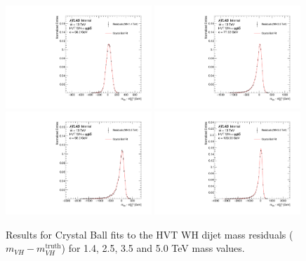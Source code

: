 \begin{figure}[htbp!]
\begin{center}
    \includegraphics[width=0.49\textwidth]{VHqqbb_WH_1400_ResoCrystalBall.pdf}
    \includegraphics[width=0.49\textwidth]{VHqqbb_WH_2500_ResoCrystalBall.pdf} \\
    \includegraphics[width=0.49\textwidth]{VHqqbb_WH_3500_ResoCrystalBall.pdf}
    \includegraphics[width=0.49\textwidth]{VHqqbb_WH_5000_ResoCrystalBall.pdf} \\
\end{center}
\caption{Results for Crystal Ball fits to the HVT WH dijet mass residuals ($m_{VH} - m_{VH}^{\mathrm{truth}}$) for 1.4, 2.5, 3.5 and 5.0 TeV mass values.}
\label{fig:mvh_reso_fits}
\end{figure}

